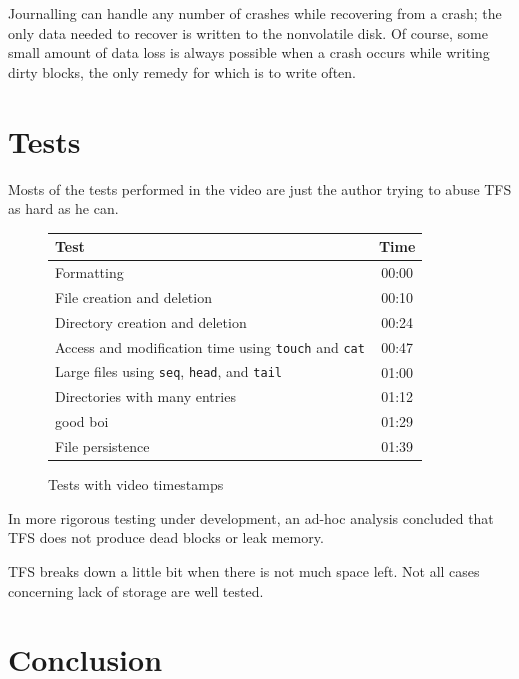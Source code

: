 \documentclass{report}
\begin{document}
Journalling can handle any number of crashes while recovering from a crash;
the only data needed to recover is written to the nonvolatile disk.
Of course, some small amount of data loss is always possible when a crash occurs
while writing dirty blocks, the only remedy for which is to write often.

\section*{Tests}

Mosts of the tests performed in the video are just the author trying to abuse TFS as hard as he can.

\begin{figure}[h!]
	\caption{Tests with video timestamps}
	\centering
	\begin{tabularx}{12cm}{Xc}
		\toprule
		\textbf{Test}                                  & \textbf{Time} \\
		\midrule[1.5pt]
		Formatting                                     & 00:00         \\
		\midrule
		File creation and deletion                     & 00:10         \\
		\midrule
		Directory creation and deletion                & 00:24         \\
		\midrule
		Access and modification time using
		\texttt{touch} and \texttt{cat}                & 00:47         \\
		\midrule
		Large files using
		\texttt{seq}, \texttt{head}, and \texttt{tail} & 01:00         \\
		\midrule
		Directories with many entries                  & 01:12         \\
		\midrule
		good boi                                       & 01:29         \\
		\midrule
		File persistence                               & 01:39         \\
		\bottomrule
	\end{tabularx}
\end{figure}

In more rigorous testing under development,
an ad-hoc analysis concluded that TFS does not produce dead blocks or leak memory.

TFS breaks down a little bit when there is not much space left.
Not all cases concerning lack of storage are well tested.

\section*{Conclusion}
\end{document}
